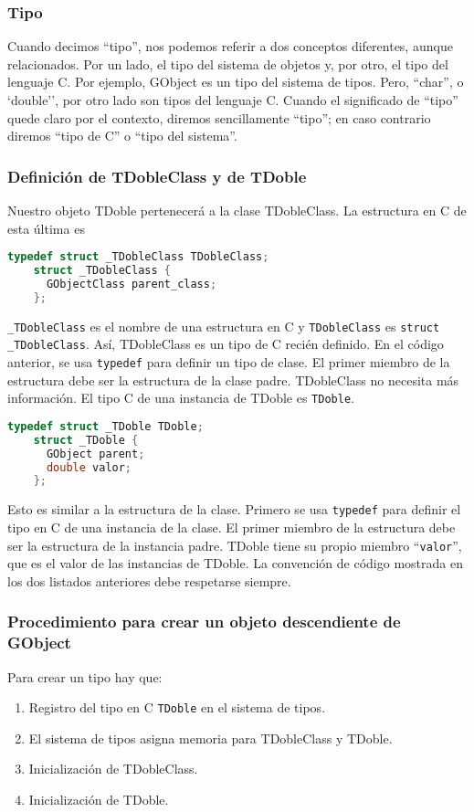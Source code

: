 \subsubsection{Tipo}
Cuando decimos ``tipo'', nos podemos referir a dos conceptos diferentes, aunque relacionados.
Por un lado, el tipo del sistema de objetos y, por otro, el tipo del lenguaje C. Por ejemplo, \textsf{GObject} es
un tipo del sistema de tipos. Pero, ``char'', o `double'', por otro lado son tipos del lenguaje C.
Cuando el significado de ``tipo'' quede claro por el contexto, diremos sencillamente ``tipo''; en caso contrario
diremos ``tipo de C'' o ``tipo del sistema''.

\subsubsection{Definición de \textsf{TDobleClass} y de \textsf{TDoble}}
  Nuestro objeto \textsf{TDoble} pertenecerá a la clase \textsf{TDobleClass}. La estructura en C de esta última es
  \begin{lstlisting}[language=C]
    typedef struct _TDobleClass TDobleClass;
    struct _TDobleClass {
      GObjectClass parent_class;
    };
  \end{lstlisting}

  \texttt{\_TDobleClass} es el nombre de una estructura en C y \texttt{TDobleClass} es \texttt{struct \_TDobleClass}.
  Así, \textsf{TDobleClass} es un tipo de C recién definido.
  En el código anterior, se usa \texttt{typedef} para definir un tipo de clase. El primer miembro de la estructura
  debe ser la estructura de la clase padre. \textsf{TDobleClass} no necesita más información. El tipo C de una
  instancia de \textsf{TDoble} es \texttt{TDoble}.
  \begin{lstlisting}[language=C]
    typedef struct _TDoble TDoble;
    struct _TDoble {
      GObject parent;
      double valor;
    };
  \end{lstlisting}
  
  Esto es similar a la estructura de la clase. Primero se usa \texttt{typedef} para definir el tipo en C de una
  instancia de la clase. El primer miembro de la estructura debe ser la estructura de la instancia padre.
  \textsf{TDoble} tiene su propio miembro ``\texttt{valor}'', que es el valor de las instancias de \textsf{TDoble}.
  La convención de código mostrada en los dos listados anteriores debe respetarse siempre.

  \subsubsection{Procedimiento para crear un objeto descendiente de \textsf{GObject}}
  Para crear un tipo  hay que:
  \begin{enumerate}
    \tightlist
  \item Registro del tipo en C \texttt{TDoble} en el sistema de tipos.
  \item El sistema de tipos asigna memoria para \textsf{TDobleClass} y \textsf{TDoble}.
  \item Inicialización de \textsf{TDobleClass}.
  \item Inicialización de \textsf{TDoble}.
  \end{enumerate}

  



